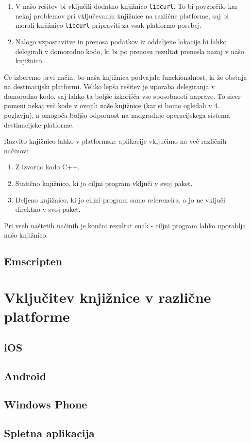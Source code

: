 \begin{enumerate}
  \item V našo rešitev bi vključili dodatno knjižnico \texttt{libcurl}. To bi povzorčilo kar nekaj problemov pri vključevanju knjižnice na različne platforme, saj bi morali knjižnico \texttt{libcurl} pripraviti za vsak platformo posebej.
  \item Nalogo vzpostavitve in prenosa podatkov iz oddaljene lokacije bi lahko delegirali v domorodno kodo, ki bi po prenosu rezultat prenesla nazaj v našo knjižnico.
\end{enumerate}

Če izberemo prvi način, bo naša knjižnica podvajala funckionalnost, ki že obstaja na destinacijski platformi. Veliko lepša rešitev je uporaba delegiranja v domorodno kodo, saj lahko ta boljše izkorišča vse sposobnosti naprave. To sicer pomeni nekaj več kode v ovojih naše knjižnice (kar si bomo ogledali v 4. poglavju), a omogoča boljšo odpornost na nadgradnje operacijskega sistema destinacijske platforme.

Razvito knjižnico lahko v platformske aplikacije vključimo na več različnih načinov:

\begin{enumerate}
  \item Z izvorno kodo C++.
  \item Statično knjižnico, ki jo ciljni program vključi v svoj paket.
  \item Deljeno knjižnico, ki jo ciljni program samo referencira, a jo ne vključi direktno v svoj paket.
\end{enumerate}

Pri vseh naštetih načinih je končni rezultat enak - ciljni program lahko uporablja našo knjižnico.

\section{Emscripten}

\chapter{Vključitev knjižnice v različne platforme}
\label{chap:cross-platform}

\section{iOS}

\section{Android}

\section{Windows Phone}

\section{Spletna aplikacija}
